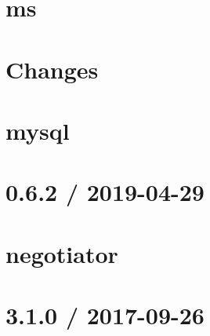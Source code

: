 \let\mypdfximage\pdfximage\def\pdfximage{\immediate\mypdfximage}\documentclass[twoside]{book}
\newcommand{\+}{\discretionary{\mbox{\scriptsize$\hookleftarrow$}}{}{}}
\begin{document}
\chapter{ms}
\label{md__c_1__git_hub__p_r_o_y_e_c_t_o-_i_i_i-_g_o_t_rest-api-node-mysql_node_modules_ms_readme}

\chapter{Changes}
\label{md__c_1__git_hub__p_r_o_y_e_c_t_o-_i_i_i-_g_o_t_rest-api-node-mysql_node_modules_mysql__changes}

\chapter{mysql}
\label{md__c_1__git_hub__p_r_o_y_e_c_t_o-_i_i_i-_g_o_t_rest-api-node-mysql_node_modules_mysql__readme}

\chapter{0.6.2 / 2019-\/04-\/29}
\label{md__c_1__git_hub__p_r_o_y_e_c_t_o-_i_i_i-_g_o_t_rest-api-node-mysql_node_modules_negotiator__h_i_s_t_o_r_y}

\chapter{negotiator}
\label{md__c_1__git_hub__p_r_o_y_e_c_t_o-_i_i_i-_g_o_t_rest-api-node-mysql_node_modules_negotiator__r_e_a_d_m_e}

\chapter{3.1.0 / 2017-\/09-\/26}
\label{md__c_1__git_hub__p_r_o_y_e_c_t_o-_i_i_i-_g_o_t_rest-api-node-mysql_node_modules_nodemon_node_modules_debug__c_h_a_n_g_e_l_o_g}

\end{document}
